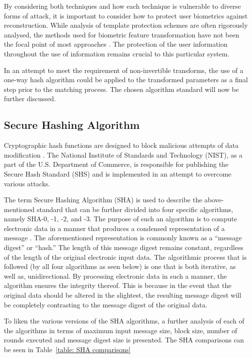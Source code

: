     
    By considering both techniques and how each technique is vulnerable to diverse forms of attack, it is important to consider how to protect user biometrics against reconstruction. While analysis of template protection schemes are often rigorously analysed, the methods used for biometric feature transformation have not been the focal point of most approaches \citep{Nagar2009}. The protection of the user information throughout the use of information remains crucial to this particular system. 
    
    In an attempt to meet the requirement of non-invertible transforms, the use of a one-way hash algorithm could be applied to the transformed parameters as a final step prior to the matching process. The chosen algorithm standard will now be further discussed.

    \subsection{ Secure Hashing Algorithm}
    
    Cryptographic hash functions are designed to block malicious attempts of data modification \citep{Pfleeger2015}. The National Institute of Standards and Technology (NIST), as a part of the U.S. Department of Commerce, is responsible for publishing the Secure Hash Standard (SHS) and is implemented in an attempt to overcome various attacks. 
    
    The term Secure Hashing Algorithm (SHA) is used to describe the above-mentioned standard that can be further divided into four specific algorithms, namely SHA-0, -1, -2, and -3. The purpose of such an algorithm is to compute electronic data in a manner that produces a condensed representation of a message \citep{Foti2015}. The aforementioned representation is commonly known as a “message digest” or “hash.” The length of this message digest remains constant, regardless of the length of the original electronic input data. The algorithmic process that is followed (by all four algorithms as seen below) is one that is both iterative, as well as, unidirectional. By processing electronic data in such a manner, the algorithm ensures the integrity thereof. This is because in the event that the original data should be altered in the slightest, the resulting message digest will be completely contrasting to the message digest of the original data. 
    
    To liken the various versions of the SHA algorithms, a further analysis of each of the algorithms in terms of maximum input message size, block size, number of rounds executed and message digest size is presented. The SHA comparisons can be seen in Table~\ref{table: SHA comparisons}
    
